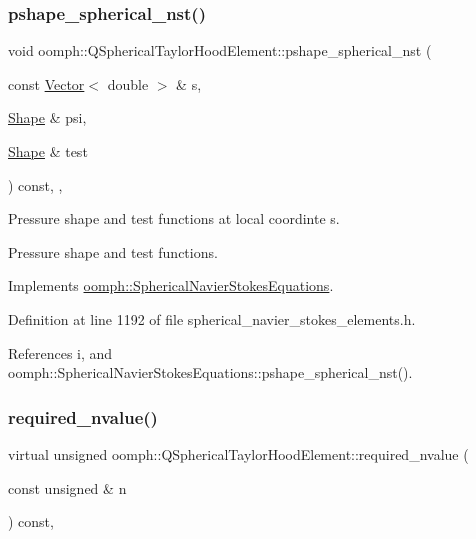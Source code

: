 \subsubsection{\texorpdfstring{pshape\+\_\+spherical\+\_\+nst()}{pshape\_spherical\_nst()}\hspace{0.1cm}{\footnotesize\ttfamily [2/2]}}
{\footnotesize\ttfamily void oomph\+::\+Q\+Spherical\+Taylor\+Hood\+Element\+::pshape\+\_\+spherical\+\_\+nst (\begin{DoxyParamCaption}\item[{const \hyperlink{classoomph_1_1Vector}{Vector}$<$ double $>$ \&}]{s,  }\item[{\hyperlink{classoomph_1_1Shape}{Shape} \&}]{psi,  }\item[{\hyperlink{classoomph_1_1Shape}{Shape} \&}]{test }\end{DoxyParamCaption}) const\hspace{0.3cm}{\ttfamily [inline]}, {\ttfamily [protected]}, {\ttfamily [virtual]}}



Pressure shape and test functions at local coordinte s. 

Pressure shape and test functions. 

Implements \hyperlink{classoomph_1_1SphericalNavierStokesEquations_a862f1da9ef70c289f4220391443b7d09}{oomph\+::\+Spherical\+Navier\+Stokes\+Equations}.



Definition at line 1192 of file spherical\+\_\+navier\+\_\+stokes\+\_\+elements.\+h.



References i, and oomph\+::\+Spherical\+Navier\+Stokes\+Equations\+::pshape\+\_\+spherical\+\_\+nst().

\mbox{\label{classoomph_1_1QSphericalTaylorHoodElement_a900be4fc6f5710905e8f562ca5a76c3d}} 
\subsubsection{\texorpdfstring{required\+\_\+nvalue()}{required\_nvalue()}}
{\footnotesize\ttfamily virtual unsigned oomph\+::\+Q\+Spherical\+Taylor\+Hood\+Element\+::required\+\_\+nvalue (\begin{DoxyParamCaption}\item[{const unsigned \&}]{n }\end{DoxyParamCaption}) const\hspace{0.3cm}{\ttfamily [inline]}, {\ttfamily [virtual]}}




